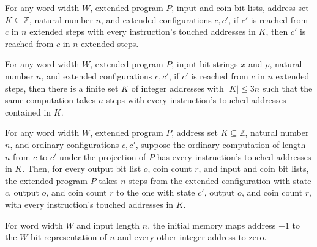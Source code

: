 \begin{theorem}
\label{WordRAM.XStepsIn.toXSteps}
\leanok
{}
For any word width $W$, extended program $P$, input and coin bit lists, address set
$K\subseteq\mathbb Z$, natural number $n$, and extended configurations $c,c'$, if $c'$
is reached from $c$ in $n$ extended steps with every instruction's touched addresses in
$K$, then $c'$ is reached from $c$ in $n$ extended steps.
\end{theorem}

\begin{theorem}
\label{WordRAM.XSteps.exists_xStepsIn}
\leanok
{}
For any word width $W$, extended program $P$, input bit strings $x$ and $\rho$, natural
number $n$, and extended configurations $c,c'$, if $c'$ is reached from $c$ in $n$
extended steps, then there is a finite set $K$ of integer addresses with $|K|\le 3n$
such that the same computation takes $n$ steps with every instruction's touched
addresses contained in $K$.
\end{theorem}

\begin{theorem}
\label{WordRAM.XStepsIn.of_stepsIn_proj}
\leanok
{}
For any word width $W$, extended program $P$, address set $K\subseteq\mathbb Z$, natural
number $n$, and ordinary configurations $c,c'$, suppose the ordinary computation of
length $n$ from $c$ to $c'$ under the projection of $P$ has every instruction's touched
addresses in $K$. Then, for every output bit list $o$, coin count $r$, and input and
coin bit lists, the extended program $P$ takes $n$ steps from the extended configuration
with state $c$, output $o$, and coin count $r$ to the one with state $c'$, output $o$,
and coin count $r$, with every instruction's touched addresses in $K$.
\end{theorem}

\begin{definition}
\label{WordRAM.initMem}
\leanok
{}
For word width $W$ and input length $n$, the initial memory maps address $-1$ to the
$W$-bit representation of $n$ and every other integer address to zero.
\end{definition}

